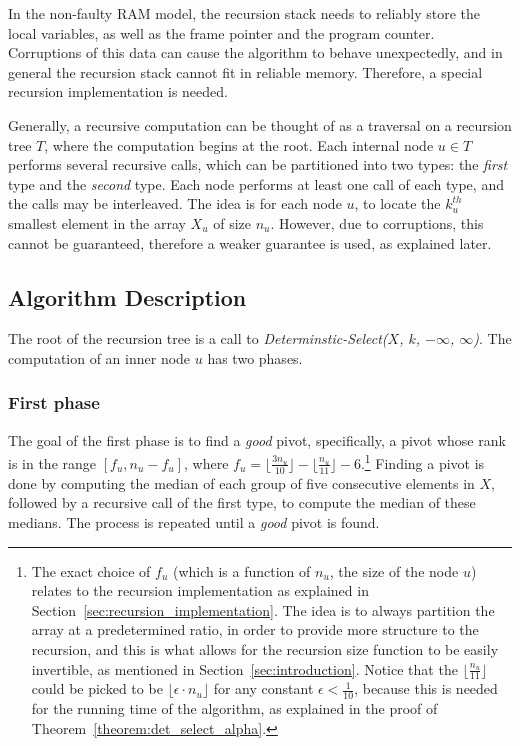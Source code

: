 \documentclass{llncs}
\begin{document}
In the non-faulty RAM model, the recursion stack needs to reliably store the local variables, as well as the frame pointer and the program counter. Corruptions of this data can cause the algorithm to behave unexpectedly, and in general the recursion stack cannot fit in reliable memory. Therefore, a special recursion implementation is needed. 

Generally, a recursive computation can be thought of as a traversal on a recursion tree $T$, where the computation begins at the root. Each internal node $u \in T$ performs several recursive calls, which can be partitioned into two types: the \emph{first} type and the \emph{second} type. Each node performs at least one call of each type, and the calls may be interleaved. The idea is for each node $u$, to locate the $k_u^{th}$ smallest element in the array $X_u$ of size $n_u$. However, due to corruptions, this cannot be guaranteed, therefore a weaker guarantee is used, as explained later.















\subsection{Algorithm Description}

The root of the recursion tree is a call to \emph{Determinstic-Select($X$, $k$, $-\infty$, $\infty$)}.
The computation of an inner node $u$ has two phases.









\subsubsection{First phase}

The goal of the first phase is to find a \emph{good} pivot, specifically, a pivot whose rank is in the range $[f_u, n_u-f_u]$, where $f_u = \lfloor \frac{3n_u}{10} \rfloor - \lfloor \frac{n_u}{11} \rfloor - 6$.\footnote{The exact choice of $f_u$ (which is a function of $n_u$, the size of the node $u$) relates to the recursion implementation as explained in Section~\ref{sec:recursion_implementation}. The idea is to always partition the array at a predetermined ratio, in order to provide more structure to the recursion, and this is what allows for the recursion size function to be easily invertible, as mentioned in Section~\ref{sec:introduction}. Notice that the $\lfloor \frac{n_u}{11} \rfloor$ could be picked to be $\lfloor \epsilon \cdot n_u \rfloor$ for any constant $\epsilon < \frac{1}{10}$, because this is needed for the running time of the algorithm, as explained in the proof of Theorem~\ref{theorem:det_select_alpha}.} Finding a pivot is done by computing the median of each group of five consecutive elements in $X$, followed by a recursive call of the first type, to compute the median of these medians. The process is repeated until a \emph{good} pivot is found.
\end{document}
